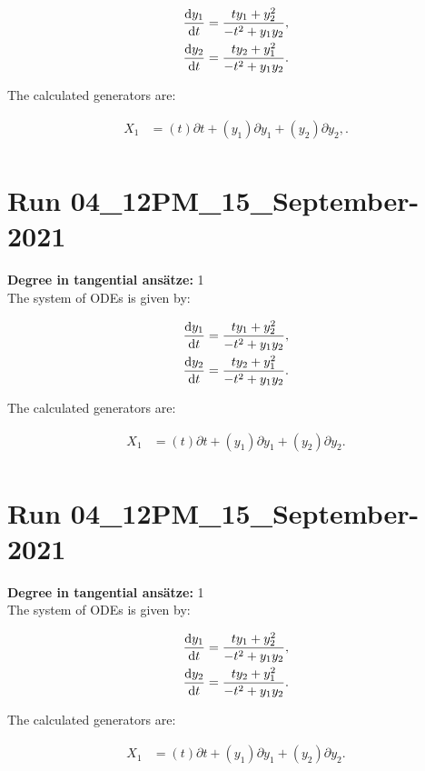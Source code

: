 \begin{align*}
\dv{y_{1}}{t}&=\frac{t y_{1} + y_{2}^{2}}{- t^{2} + y_{1} y_{2}},\\
\dv{y_{2}}{t}&=\frac{t y_{2} + y_{1}^{2}}{- t^{2} + y_{1} y_{2}}.\\
\end{align*}

\noindent The calculated generators are:

\begin{align*}
X_{1}&=\left( t \right)\partial t+\left( y_{1} \right)\partial y_{1}+\left( y_{2} \right)\partial y_{2},.\\
\end{align*}
\section*{Run 04\_12PM\_15\_September-2021}
\textbf{Degree in tangential ansätze:}	1\\
The system of ODEs is given by:

\begin{align*}
\dv{y_{1}}{t}&=\frac{t y_{1} + y_{2}^{2}}{- t^{2} + y_{1} y_{2}},\\
\dv{y_{2}}{t}&=\frac{t y_{2} + y_{1}^{2}}{- t^{2} + y_{1} y_{2}}.\\
\end{align*}

\noindent The calculated generators are:

\begin{align*}
X_{1}&=\left( t \right)\partial t+\left( y_{1} \right)\partial y_{1}+\left( y_{2} \right)\partial y_{2}.\\
\end{align*}
\section*{Run 04\_12PM\_15\_September-2021}
\textbf{Degree in tangential ansätze:}	1\\
The system of ODEs is given by:

\begin{align*}
\dv{y_{1}}{t}&=\frac{t y_{1} + y_{2}^{2}}{- t^{2} + y_{1} y_{2}},\\
\dv{y_{2}}{t}&=\frac{t y_{2} + y_{1}^{2}}{- t^{2} + y_{1} y_{2}}.\\
\end{align*}

\noindent The calculated generators are:

\begin{align*}
X_{1}&=\left( t \right)\partial t+\left( y_{1} \right)\partial y_{1}+\left( y_{2} \right)\partial y_{2}.\\
\end{align*}
